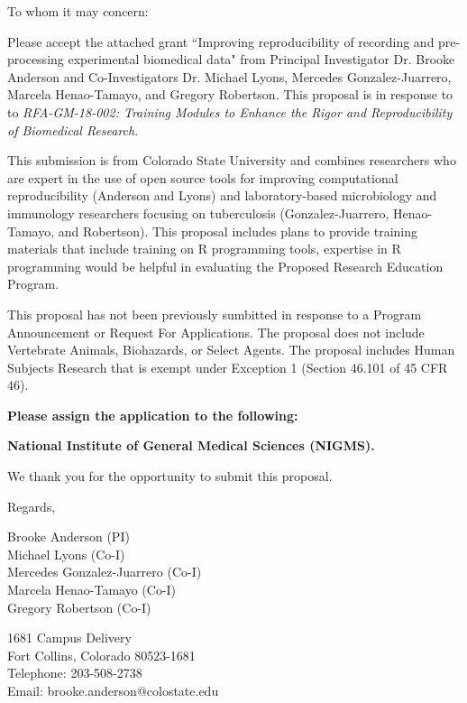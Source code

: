 \documentclass[pdftex,english,11pt,parskip=half]{scrartcl}
\begin{document}
\def\bf{\normalfont\bfseries}
\pagestyle{empty}

To whom it may concern:

\vspace{0.2in}

Please accept the attached grant ``Improving reproducibility of recording and pre-processing experimental biomedical data" from Principal Investigator Dr. Brooke Anderson and Co-Investigators Dr. Michael Lyons, Mercedes Gonzalez-Juarrero, Marcela Henao-Tamayo, and Gregory Robertson. This proposal is in response to to \textit{RFA-GM-18-002: Training Modules to Enhance the Rigor and Reproducibility of Biomedical Research}.

\vspace{0.1in}

This submission is from Colorado State University and combines researchers who are expert in the use of open source tools for improving computational reproducibility (Anderson and Lyons) and laboratory-based microbiology and immunology researchers focusing on tuberculosis (Gonzalez-Juarrero, Henao-Tamayo, and Robertson). This proposal includes plans to provide training materials that include training on R programming tools, expertise in R programming would be helpful in evaluating the Proposed Research Education Program.

\vspace{0.1in}

This proposal has not been previously sumbitted in response to a Program Announcement or Request For Applications. The proposal does not include Vertebrate Animals, Biohazards, or Select Agents. The proposal includes Human Subjects Research that is exempt under Exception 1 (Section 46.101 of 45 CFR 46).

\vspace{0.1in}

\noindent \textbf{Please assign the application to the following:}
\begin{description}
 \item \textbf{National Institute of General Medical Sciences (NIGMS).} 
 \end{description}

\vspace{0.1in}

We thank you for the opportunity to submit this proposal. 

\vspace{0.2in}

Regards, 

Brooke Anderson (PI) \\
Michael Lyons (Co-I) \\
Mercedes Gonzalez-Juarrero (Co-I) \\
Marcela Henao-Tamayo (Co-I) \\
Gregory Robertson (Co-I)

1681 Campus Delivery \\
Fort Collins, Colorado 80523-1681 \\
Telephone: 203-508-2738 \\
Email: brooke.anderson@colostate.edu \\
\end{document}
